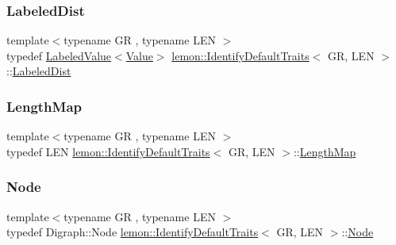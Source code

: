\subsubsection{\texorpdfstring{Labeled\+Dist}{LabeledDist}}
{\footnotesize\ttfamily template$<$typename GR , typename L\+EN $>$ \\
typedef \hyperlink{classlemon_1_1_labeled_value}{Labeled\+Value}$<$\hyperlink{structlemon_1_1_identify_default_traits_ae44641190d3358bbe94ff53a18c36193}{Value}$>$ \hyperlink{structlemon_1_1_identify_default_traits}{lemon\+::\+Identify\+Default\+Traits}$<$ GR, L\+EN $>$\+::\hyperlink{structlemon_1_1_identify_default_traits_a6f612abe02956f7a3c607e882d7e8d87}{Labeled\+Dist}}

\mbox{\label{structlemon_1_1_identify_default_traits_a1edc74d982d4d9b918cffcf2ba6b5ec7}} 
\subsubsection{\texorpdfstring{Length\+Map}{LengthMap}}
{\footnotesize\ttfamily template$<$typename GR , typename L\+EN $>$ \\
typedef L\+EN \hyperlink{structlemon_1_1_identify_default_traits}{lemon\+::\+Identify\+Default\+Traits}$<$ GR, L\+EN $>$\+::\hyperlink{structlemon_1_1_identify_default_traits_a1edc74d982d4d9b918cffcf2ba6b5ec7}{Length\+Map}}

\mbox{\label{structlemon_1_1_identify_default_traits_a8cd1d66e1f5de579d028a3b18561ea5a}} 
\subsubsection{\texorpdfstring{Node}{Node}}
{\footnotesize\ttfamily template$<$typename GR , typename L\+EN $>$ \\
typedef Digraph\+::\+Node \hyperlink{structlemon_1_1_identify_default_traits}{lemon\+::\+Identify\+Default\+Traits}$<$ GR, L\+EN $>$\+::\hyperlink{structlemon_1_1_identify_default_traits_a8cd1d66e1f5de579d028a3b18561ea5a}{Node}}

